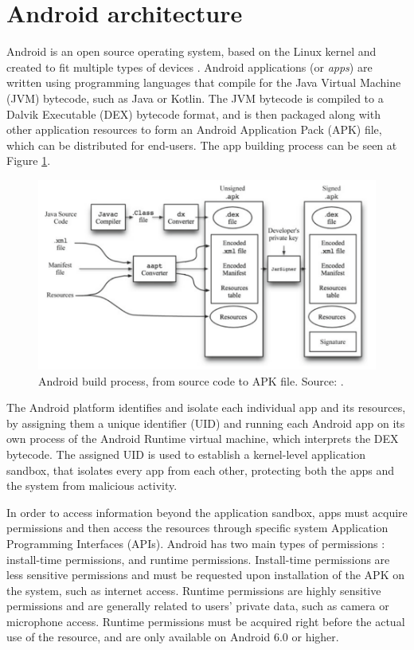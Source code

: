 \section{Android architecture}

Android is an open source operating system, based on the Linux kernel and created to fit multiple types of devices \cite{noauthor_platform_2023}.
Android applications (or \textit{apps}) are written using programming languages that compile for the Java Virtual Machine (JVM) bytecode, such as Java or Kotlin. The JVM bytecode is compiled to a Dalvik Executable (DEX) bytecode format, and is then packaged along with other application resources to form an Android Application Pack (APK) file, which can be distributed for end-users. The app building process can be seen at Figure \ref{fig:android-build}.

\begin{figure}
    \centering
    \includegraphics[width=\textwidth]{img/android_build.png}
    \caption{Android build process, from source code to APK file. Source: \cite{jung_repackaging_2013}.}
    \label{fig:android-build}
\end{figure}

The Android platform identifies and isolate each individual app and its resources, by assigning them a unique identifier (UID) and running each Android app on its own process \cite{noauthor_application_2022} of the Android Runtime virtual machine, which interprets the DEX bytecode. The assigned UID is used to establish a kernel-level application sandbox, that isolates every app from each other, protecting both the apps and the system from malicious activity.

In order to access information beyond the application sandbox, apps must acquire permissions and then access the resources through specific system Application Programming Interfaces (APIs). Android has two main types of permissions \cite{noauthor_permissions_2023}: install-time permissions, and runtime permissions. Install-time permissions are less sensitive permissions and must be requested upon installation of the APK on the system, such as internet access. Runtime permissions are highly sensitive permissions and are generally related to users' private data, such as camera or microphone access. Runtime permissions must be acquired right before the actual use of the resource, and are only available on Android 6.0 or higher.


